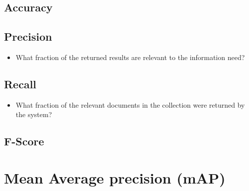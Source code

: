 \subsection{Accuracy}

\subsection{Precision}
\begin{itemize}
    \item What fraction of the returned results are relevant to the information need? \cite{ir-1}
\end{itemize}

\subsection{Recall}
\begin{itemize}
    \item What fraction of the relevant documents in the collection were returned by the system? \cite{ir-1}
\end{itemize}

\subsection{F-Score}


\section{Mean Average precision (mAP)}\label{Mean Average precision (mAP)}


















































